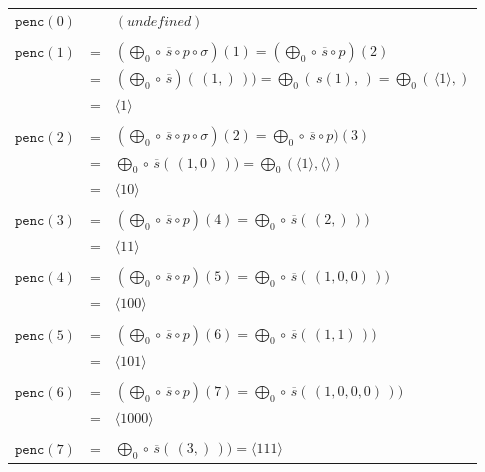 \documentclass[12pt,reqno]{article}
\begin{document}
\begin{center} \begin{tabular}{l c l}
  $\texttt{penc}(0)$ &    & $(undefined)$ \\
  \\
  $\texttt{penc}(1)$ & = & $(\bigoplus_0 \circ \, \overline{s} \circ p \circ \sigma) (1) = (\bigoplus_0 \circ \, \overline{s} \circ p) (2) $ \\
                              & = & $(\bigoplus_0 \circ \, \overline{s}) (\, (1,) \, )) = \bigoplus_0 ( \, s(1), \,) = \bigoplus_0 ( \, \langle 1 \rangle, )$ \\
                              & = & $\langle 1 \rangle$ \\
  \\
  $\texttt{penc}(2)$ & = & $(\bigoplus_0 \circ \, \overline{s} \circ p \circ \sigma) (2) = \bigoplus_0 \circ \, \overline{s} \circ p) (3)$ \\
                              & = & $\bigoplus_0 \circ \, \overline{s} (\, (1, 0) \, )) = \bigoplus_0 ( \langle 1 \rangle, \langle \rangle )$ \\
                              & = & $\langle 10 \rangle$ \\
  \\
  $\texttt{penc}(3)$ & = & $(\bigoplus_0 \circ \, \overline{s} \circ p) (4) = \bigoplus_0 \circ \, \overline{s} (\, (2,) \, )) $ \\
                              & = & $\langle 11 \rangle $ \\
  \\
  $\texttt{penc}(4)$ & = & $(\bigoplus_0 \circ \, \overline{s} \circ p) (5) = \bigoplus_0 \circ \, \overline{s} (\, (1, 0, 0) \, )) $ \\
                               & = & $\langle 100 \rangle$ \\
  \\
  $\texttt{penc}(5)$ & = & $(\bigoplus_0 \circ \, \overline{s} \circ p) (6) = \bigoplus_0 \circ \, \overline{s} (\, (1, 1) \, ))$ \\
                              & = & $\langle 101 \rangle$ \\
  \\
  $\texttt{penc}(6)$ & = & $(\bigoplus_0 \circ \, \overline{s} \circ p) (7) = \bigoplus_0 \circ \, \overline{s} (\, (1, 0, 0, 0) \, )) $ \\
                              & = & $\langle 1000 \rangle$ \\
  \\
  $\texttt{penc}(7)$ & = & $\bigoplus_0 \circ \, \overline{s} (\, (3,) \, )) = \langle 111 \rangle$ \\
\end{tabular} \end{center}
\end{document}
